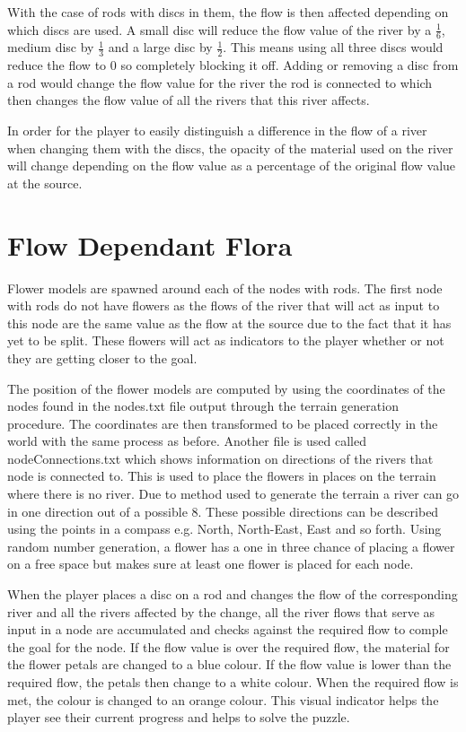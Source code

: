 \newline
\par
With the case of rods with discs in them, the flow is then affected depending on which discs are used. A small disc will reduce the flow value of the river by a \(\frac{1}{6}\), medium disc by \(\frac{1}{3}\) and a large disc by \(\frac{1}{2}\). This means using all three discs would reduce the flow to 0 so completely blocking it off. Adding or removing a disc from a rod would change the flow value for the river the rod is connected to which then changes the flow value of all the rivers that this river affects.
\newline
\par
In order for the player to easily distinguish a difference in the flow of a river when changing them with the discs, the opacity of the material used on the river will change depending on the flow value as a percentage of the original flow value at the source.

\section{Flow Dependant Flora}
Flower models are spawned around each of the nodes with rods. The first node with rods do not have flowers as the flows of the river that will act as input to this node are the same value as the flow at the source due to the fact that it has yet to be split. These flowers will act as indicators to the player whether or not they are getting closer to the goal.
\newline
\par
The position of the flower models are computed by using the coordinates of the nodes found in the nodes.txt file output through the terrain generation procedure. The coordinates are then transformed to be placed correctly in the world with the same process as before. Another file is used called nodeConnections.txt which shows information on directions of the rivers that node is connected to. This is used to place the flowers in places on the terrain where there is no river. Due to method used to generate the terrain a river can go in one direction out of a possible 8. These possible directions can be described using the points in a compass e.g. North, North-East, East and so forth. Using random number generation, a flower has a one in three chance of placing a flower on a free space but makes sure at least one flower is placed for each node.
\newline
\par
When the player places a disc on a rod and changes the flow of the corresponding river and all the rivers affected by the change, all the river flows that serve as input in a node are accumulated and checks against the required flow to comple the goal for the node. If the flow value is over the required flow, the material for the flower petals are changed to a blue colour. If the flow value is lower than the required flow, the petals then change to a white colour. When the required flow is met, the colour is changed to an orange colour. This visual indicator helps the player see their current progress and helps to solve the puzzle.

